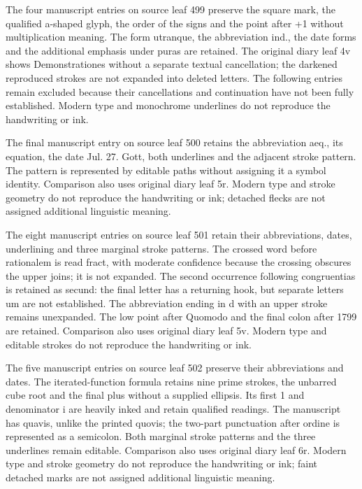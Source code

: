 The four manuscript entries on source leaf 499 preserve the square mark, the qualified a-shaped glyph, the order of the signs and the point after +1 without multiplication meaning. The form utranque, the abbreviation ind., the date forms and the additional emphasis under puras are retained. The original diary leaf 4v shows Demonstrationes without a separate textual cancellation; the darkened reproduced strokes are not expanded into deleted letters. The following entries remain excluded because their cancellations and continuation have not been fully established. Modern type and monochrome underlines do not reproduce the handwriting or ink.

The final manuscript entry on source leaf 500 retains the abbreviation aeq., its equation, the date Jul. 27. Gott, both underlines and the adjacent stroke pattern. The pattern is represented by editable paths without assigning it a symbol identity. Comparison also uses original diary leaf 5r. Modern type and stroke geometry do not reproduce the handwriting or ink; detached flecks are not assigned additional linguistic meaning.

The eight manuscript entries on source leaf 501 retain their abbreviations, dates, underlining and three marginal stroke patterns. The crossed word before rationalem is read fract, with moderate confidence because the crossing obscures the upper joins; it is not expanded. The second occurrence following congruentias is retained as secund: the final letter has a returning hook, but separate letters um are not established. The abbreviation ending in d with an upper stroke remains unexpanded. The low point after Quomodo and the final colon after 1799 are retained. Comparison also uses original diary leaf 5v. Modern type and editable strokes do not reproduce the handwriting or ink.

The five manuscript entries on source leaf 502 preserve their abbreviations and dates. The iterated-function formula retains nine prime strokes, the unbarred cube root and the final plus without a supplied ellipsis. Its first 1 and denominator i are heavily inked and retain qualified readings. The manuscript has quavis, unlike the printed quovis; the two-part punctuation after ordine is represented as a semicolon. Both marginal stroke patterns and the three underlines remain editable. Comparison also uses original diary leaf 6r. Modern type and stroke geometry do not reproduce the handwriting or ink; faint detached marks are not assigned additional linguistic meaning.

